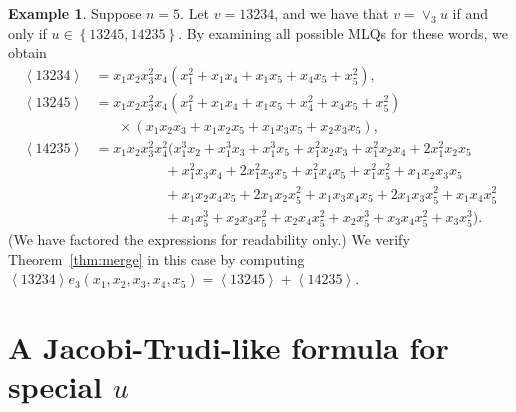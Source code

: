 \documentclass[reqno]{amsart}
\newcommand{\0}{\phantom{c}}
\newcommand{\swt}[1]{\left\langle #1 \right\rangle} %
\newcommand{\merge}[1]{\vee_{#1}} %
\newcommand{\set}[1]{\left\{ #1 \right\}}
\theoremstyle{plain}
\theoremstyle{definition}
\newtheorem{example}[thm]{Example}
\numberwithin{equation}{section}
\begin{document}
\begin{example}
Suppose $n = 5$.
Let $v = 13234$, and we have that $v = \merge{3} u$ if and only if $u \in \set{13245, 14235}$.
By examining all possible MLQs for these words, we obtain
\begin{align*}
\swt{13234} & = x_1 x_2 x_3^2 x_4 (x_1^2 + x_1 x_4 + x_1 x_5 + x_4 x_5 + x_5^2),
\\ \swt{13245} & = x_1 x_2 x_3^2 x_4 (x_1^2 + x_1x_4 + x_1x_5 + x_4^2 + x_4x_5 + x_5^2)
\\ & \hspace{20pt} \times (x_1x_2x_3 + x_1x_2x_5+x_1x_3x_5+x_2x_3x_5),
\\ \swt{14235} & = x_1x_2x_3^2x_4^2 (x_1^3x_2 + x_1^3x_3 + x_1^3x_5 + x_1^2x_2x_3 + x_1^2x_2x_4 + 2x_1^2x_2x_5
\\ & \hspace{60pt} + x_1^2x_3x_4 + 2x_1^2x_3x_5 + x_1^2x_4x_5 + x_1^2x_5^2 + x_1x_2x_3x_5
\\ & \hspace{60pt} + x_1x_2x_4x_5 + 2x_1x_2x_5^2 + x_1x_3x_4x_5 + 2x_1x_3x_5^2 + x_1x_4x_5^2
\\ & \hspace{60pt} + x_1x_5^3 + x_2x_3x_5^2 + x_2x_4x_5^2 + x_2x_5^3 + x_3x_4x_5^2 + x_3x_5^3).
\end{align*}
(We have factored the expressions for readability only.)
We verify Theorem~\ref{thm:merge} in this case by computing $\swt{13234} e_3(x_1, x_2, x_3, x_4, x_5) = \swt{13245} + \swt{14235}$.
\end{example}








\section{A Jacobi-Trudi-like formula for special $u$}
\label{sec:JT_formula}
\end{document}

